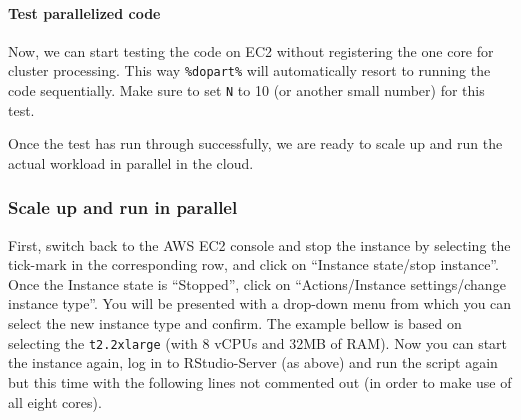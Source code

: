 \documentclass[
  12pt,
]{style/krantz}
\newenvironment{Shaded}{\begin{snugshade}}{\end{snugshade}}
\newcommand{\AttributeTok}[1]{\textcolor[rgb]{0.77,0.63,0.00}{#1}}
\newcommand{\CommentTok}[1]{\textcolor[rgb]{0.56,0.35,0.01}{\textit{#1}}}
\newcommand{\DecValTok}[1]{\textcolor[rgb]{0.00,0.00,0.81}{#1}}
\newcommand{\FunctionTok}[1]{\textcolor[rgb]{0.00,0.00,0.00}{#1}}
\newcommand{\NormalTok}[1]{#1}
\newcommand{\OtherTok}[1]{\textcolor[rgb]{0.56,0.35,0.01}{#1}}
\newcommand{\SpecialCharTok}[1]{\textcolor[rgb]{0.00,0.00,0.00}{#1}}
\begin{document}
\hypertarget{test-parallelized-code}{%
\paragraph{Test parallelized code}\label{test-parallelized-code}}

Now, we can start testing the code on EC2 without registering the one core for cluster processing. This way \texttt{\%dopart\%} will automatically resort to running the code sequentially. Make sure to set \texttt{N} to 10 (or another small number) for this test.

\begin{Shaded}
\end{Shaded}

Once the test has run through successfully, we are ready to scale up and run the actual workload in parallel in the cloud.

\hypertarget{scale-up-and-run-in-parallel}{%
\subsubsection{Scale up and run in parallel}\label{scale-up-and-run-in-parallel}}

First, switch back to the AWS EC2 console and stop the instance by selecting the tick-mark in the corresponding row, and click on ``Instance state/stop instance''. Once the Instance state is ``Stopped'', click on ``Actions/Instance settings/change instance type''. You will be presented with a drop-down menu from which you can select the new instance type and confirm. The example bellow is based on selecting the \texttt{t2.2xlarge} (with 8 vCPUs and 32MB of RAM). Now you can start the instance again, log in to RStudio-Server (as above) and run the script again but this time with the following lines not commented out (in order to make use of all eight cores).
\end{document}
